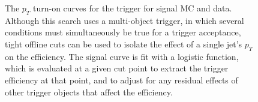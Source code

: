 \begin{figure}[phtb!]
\begin{center}
  \caption{The $p_T$ turn-on curves for the trigger for signal MC and data.
  Although this search uses a multi-object trigger, in which several conditions 
  must simultaneously be true for a trigger acceptance, tight offline cuts can be used to isolate the effect 
  of a single jet's $p_T$ on the efficiency.  The signal curve is fit with a
  logistic function, which is evaluated at a given cut point to extract the trigger efficiency at that point, and to 
  adjust for any residual effects of other trigger objects that affect the efficiency. \label{fig:trigger_turn_on_1}}
    \end{center}
\end{figure}


